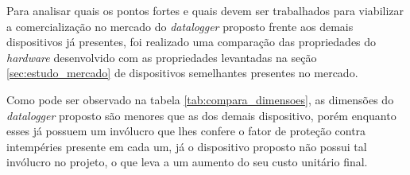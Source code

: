 Para analisar quais os pontos fortes e quais devem ser trabalhados para viabilizar a comercialização no mercado do \textit{datalogger} proposto frente aos demais dispositivos já presentes, foi realizado uma comparação das propriedades do \textit{hardware} desenvolvido com as propriedades levantadas na seção \ref{sec:estudo_mercado} de dispositivos semelhantes presentes no mercado.



\begin{table}[!h]
	
	\captionsetup{width=7cm}%
\end{table}


Como pode ser observado na tabela \ref{tab:compara_dimensoes}, as dimensões do \textit{datalogger} proposto são menores que as dos demais dispositivo, porém enquanto esses já possuem um invólucro que lhes confere o fator de proteção contra intempéries presente em cada um, já o dispositivo proposto não possui tal invólucro no projeto, o que leva a um aumento do seu custo unitário final. 

